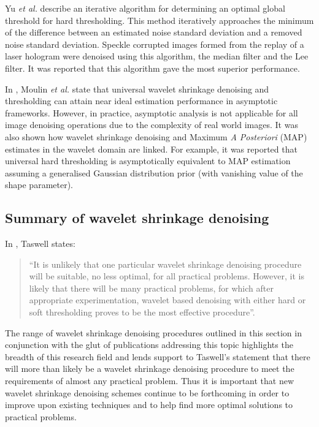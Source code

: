 \documentclass[12pt]{report}
\begin{document}
Yu \emph{et al.} \cite{yu96} describe an iterative algorithm for determining an optimal 
global threshold for hard thresholding. This method iteratively approaches the minimum of
the difference between an estimated noise standard deviation and a removed noise standard 
deviation. Speckle corrupted images formed from the replay of a laser hologram were denoised
using this algorithm, the median filter and the Lee filter. It was reported that this
algorithm gave the most superior performance.

In \cite{moulinLiu}, Moulin \emph{et al.} state that 
universal wavelet shrinkage denoising and thresholding 
can attain near ideal estimation performance in asymptotic frameworks. However, 
in practice, asymptotic analysis is not applicable for all image denoising operations
due to the complexity of real world images. It was also shown how wavelet shrinkage 
denoising and Maximum \emph{A Posteriori} (MAP) estimates in the wavelet domain are linked.
For example, it was reported that universal hard thresholding is asymptotically equivalent to
MAP estimation assuming a generalised Gaussian distribution prior (with vanishing value of the
shape parameter).
 
\subsection{Summary of wavelet shrinkage denoising}
                                                                                                               
In \cite{taswellHWW}, Taswell states: 

\begin{quote}
``It is unlikely that one particular wavelet shrinkage denoising procedure will be suitable,
no less optimal, for all practical problems. However, 
it is likely that there will be many practical problems, for which after 
appropriate experimentation, wavelet based denoising with either hard or soft thresholding proves to be the most 
effective procedure''. 
\end{quote}    

The range of wavelet shrinkage denoising procedures outlined in this section 
in conjunction with the glut of publications addressing this topic 
highlights the breadth of this research field and lends support to Taswell's statement that there will more than likely
be a wavelet shrinkage denoising procedure to meet the requirements of almost any practical problem. 
Thus it is important that new wavelet shrinkage denoising schemes continue to be forthcoming in order to
improve upon existing techniques and to help find more optimal solutions to practical problems.
\end{document}
